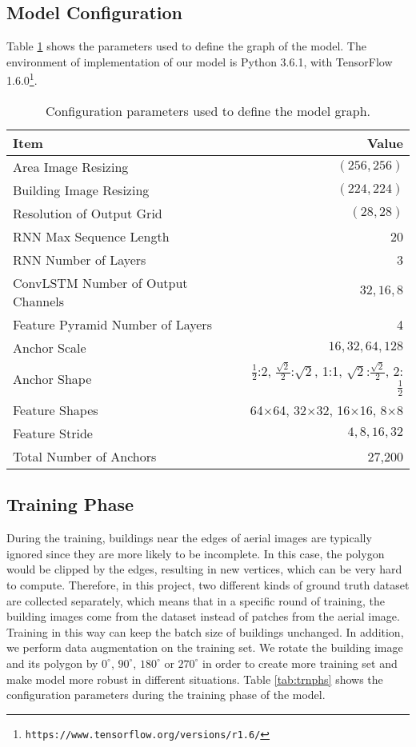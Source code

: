 \subsection{Model Configuration}\label{config}
Table \ref{tab:configpara} shows the parameters used to define the graph of the model. The environment of implementation of our model is Python 3.6.1, with TensorFlow 1.6.0\setcounter{footnote}{0}\footnote{\lstinline{https://www.tensorflow.org/versions/r1.6/}}.
\begin{table}[!h]
	\centering
	\caption[Configuration parameters used to define the model graph]{Configuration  parameters used to define the model graph.}
	\label{tab:configpara}
	\begin{tabular}{l|r}
	\hline
	\textbf{Item} & \textbf{Value} \\
	\hline
	Area Image Resizing & $(256, 256)$ \\
	Building Image Resizing & $(224, 224)$ \\
	Resolution of Output Grid & $(28, 28)$ \\
	\hline
	RNN Max Sequence Length & 20 \\
	RNN Number of Layers & 3 \\
	ConvLSTM Number of Output Channels & $32, 16, 8$ \\
	\hline
	Feature Pyramid Number of Layers & 4 \\
	Anchor Scale & $16, 32, 64, 128$ \\
	Anchor Shape & $\frac{1}{2}$:2, $\frac{\sqrt{2}}{2}$:$\sqrt{2}$, 1:1, $\sqrt{2}$:$\frac{\sqrt{2}}{2}$, 2:$\frac{1}{2}$ \\
	Feature Shapes & 64$\times$64, 32$\times$32, 16$\times$16, 8$\times$8 \\
	Feature Stride & $4, 8, 16, 32$ \\
	Total Number of Anchors & 27,200 \\
	\hline
	\end{tabular}
\end{table}

\subsection{Training Phase}\label{trnphs}
During the training, buildings near the edges of aerial images are typically ignored since they are more likely to be incomplete. In this case, the polygon would be clipped by the edges, resulting in new vertices, which can be very hard to compute. Therefore, in this project, two different kinds of ground truth dataset are collected separately, which means that in a specific round of training, the building images come from the dataset instead of patches from the aerial image. Training in this way can keep the batch size of buildings unchanged. In addition, we perform data augmentation on the training set. We rotate the building image and its polygon by $0^\circ$, $90^\circ$, $180^\circ$ or $270^\circ$ in order to create more training set and make model more robust in different situations. Table \ref{tab:trnphs} shows the configuration parameters during the training phase of the model.

